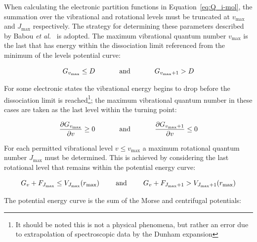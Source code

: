
When calculating the electronic partition functions in Equation~\ref{eq:Q_i-mol}, the summation over the vibrational and rotational levels must be truncated at $v_\text{max}$ and $J_\text{max}$ respectively.
The strategy for determining these parameters described by Babou \textit{et al.}~\cite{BRP+2009b} is adopted.
The maximum vibrational quantum number  $v_\text{max}$ is the last that has energy within the dissociation limit referenced from the minimum of the levels potential curve:

\begin{equation}
 G_{v_\text{max}} \leq D \text{ \hspace{1cm} and \hspace{1cm} } G_{v_\text{max}+1} > D
\end{equation}

For some electronic states the vibrational energy begins to drop before the dissociation limit is reached\footnote{It should be noted this is not a physical phenomena, but rather an error due to extrapolation of spectroscopic data by the Dunham expansion}; the maximum vibrational quantum number in these cases are taken as the last level within the turning point:

\begin{equation}
 \frac{\partial G_{v_\text{max}}}{ \partial v } \geq 0 \text{ \hspace{1cm} and \hspace{1cm} }  \frac{\partial G_{v_\text{max}+1}}{ \partial v } \leq 0
\end{equation}

For each permitted vibrational level $v \leq v_\text{max}$ a maximum rotational quantum number $J_\text{max}$ must be determined.
This is achieved by considering the last rotational level that remains within the potential energy curve:

\begin{equation}
 G_v + F_{J_\text{max}} \leq V_{J_\text{max}} ( r_\text{max}  ) \text{ \hspace{0.6cm} and \hspace{0.6cm} } G_v + F_{J_\text{max}+1} > V_{J_\text{max}+1} ( r_\text{max} )
\end{equation}

The potential energy curve is the sum of the Morse and centrifugal potentials:

